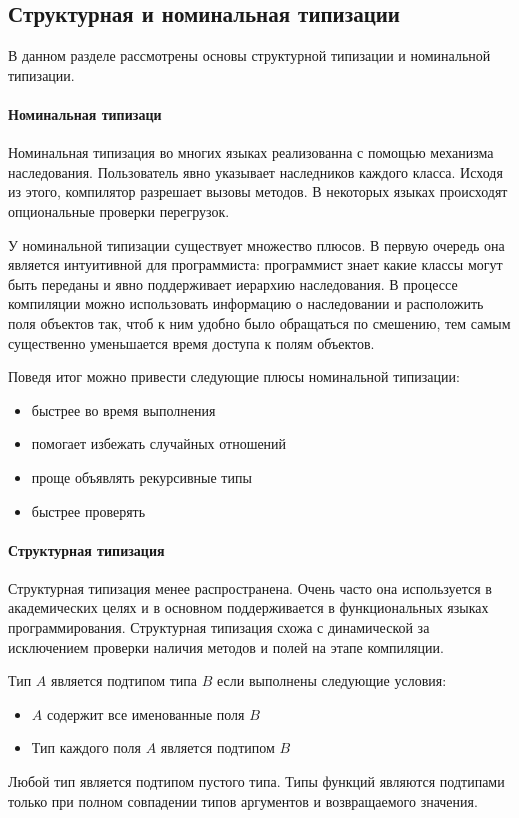\subsection{Структурная и номинальная типизации}
В данном разделе рассмотрены основы структурной типизации и номинальной типизации.

\paragraph{Номинальная типизаци}
Номинальная типизация во многих языках реализованна с помощью механизма наследования. Пользователь явно указывает наследников каждого класса. Исходя из этого, компилятор разрешает вызовы методов. В некоторых языках происходят опциональные проверки перегрузок.

У номинальной типизации существует множество плюсов. В первую очередь она является интуитивной для программиста: программист знает какие классы могут быть переданы и явно поддерживает иерархию наследования. В процессе компиляции можно использовать информацию о наследовании и расположить поля объектов так, чтоб к ним удобно было обращаться по смешению, тем самым существенно уменьшается время доступа к полям объектов.

Поведя итог можно привести следующие плюсы номинальной типизации:
\begin{itemize}
    \item быстрее во время выполнения
    \item помогает избежать случайных отношений
    \item проще объявлять рекурсивные типы
    \item быстрее проверять
\end{itemize}

\paragraph{Структурная типизация}
Структурная типизация менее распространена. Очень часто она используется в академических целях и в основном поддерживается в функциональных языках программирования. Структурная типизация схожа с динамической за исключением проверки наличия методов и полей на этапе компиляции.

Тип $A$ является подтипом типа $B$ если выполнены следующие условия:
\begin{itemize}
    \item $A$ содержит все именованные поля $B$
    \item Тип каждого поля $A$ является подтипом $B$
\end{itemize}
Любой тип является подтипом пустого типа. Типы функций являются подтипами только при полном совпадении типов аргументов и возвращаемого значения.

